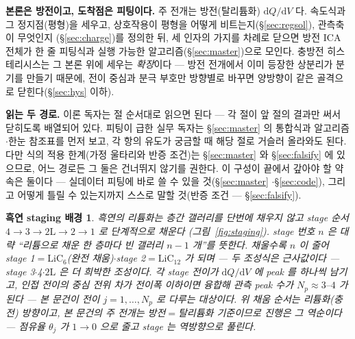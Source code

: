 \documentclass[11pt,a4paper]{article}
\newtheorem*{stagebox}{흑연 staging 배경}
\newcommand{\dd}{\mathrm{d}}
\begin{document}
\textbf{본론은 방전이고, 도착점은 피팅이다.} 주 전개는 방전(탈리튬화) $\dd Q/\dd V$ 다. 속도식과 그
정지점(평형)을 세우고, 상호작용이 평형을 어떻게 비트는지(\S\ref{sec:regsol}), 관측축이 무엇인지
(\S\ref{sec:charge})를 정의한 뒤, 세 인자의 가지를 차례로 닫으면 방전 ICA 전체가 한 줄 피팅식과 실행
가능한 알고리즘(\S\ref{sec:master})으로 모인다. 충방전 히스테리시스는 그 본론 위에 세우는 \emph{확장}이다 —
방전 전개에서 이미 등장한 상분리가 분기를 만들기 때문에, 전이 중심과 분극 부호만 방향별로 바꾸면 양방향이
같은 골격으로 닫힌다(\S\ref{sec:hys} 이하).

\textbf{읽는 두 경로.} 이론 독자는 절 순서대로 읽으면 된다 — 각 절이 앞 절의 결과만 써서 닫히도록 배열되어
있다. 피팅이 급한 실무 독자는 \S\ref{sec:master} 의 통합식과 알고리즘$\cdot$한눈 참조표를 먼저 보고, 각 항의
유도가 궁금할 때 해당 절로 거슬러 올라와도 된다. 다만 식의 적용 한계(가정 울타리와 반증 조건)는
\S\ref{sec:master} 와 \S\ref{sec:falsify} 에 있으므로, 어느 경로든 그 둘은 건너뛰지 않기를 권한다.
이 구성이 끝에서 갚아야 할 약속은 둘이다 — 실데이터 피팅에 바로 쓸 수 있을 것(\S\ref{sec:master}
$\cdot$\S\ref{sec:code}), 그리고 어떻게 틀릴 수 있는지까지 스스로 말할 것(반증 조건 —
\S\ref{sec:falsify}).

\begin{stagebox}
흑연의 리튬화는 층간 갤러리를 단번에 채우지 않고 \emph{stage} 순서 $4\to3\to2\mathrm L\to2\to1$ 로 단계적으로
채운다 \cite{dahn1991,ohzuku1993}(그림~\ref{fig:staging}). stage 번호 $n$ 은 대략 ``리튬으로 채운 한 층마다 빈 갤러리 $n-1$ 개''를
뜻한다. 채울수록 $n$ 이 줄어 stage 1$=\mathrm{LiC_6}$(완전 채움)$\cdot$stage 2$=\mathrm{LiC_{12}}$ 가 되며 — 두 조성식은
근사값이다 — stage 3$\cdot$4$\cdot$$2\mathrm L$ 은 더 희박한 조성이다. 각 stage 전이가 $\dd Q/\dd V$ 에 peak 를 하나씩
남기고, 인접 전이의 중심 전위 차가 전이폭 이하이면 융합해 관측 peak 수가 $N_p\approx3\text{--}4$ 가 된다 — 본
문건이 전이 $j=1,\dots,N_p$ 로 다루는 대상이다. 위 채움 순서는 리튬화(충전) 방향이고, 본 문건의 주 전개는
방전$=$탈리튬화 기준이므로 진행은 그 역순이다 — 점유율 $\theta_j$ 가 $1\to0$ 으로 줄고 stage 는 역방향으로
풀린다.
\end{stagebox}
\end{document}
